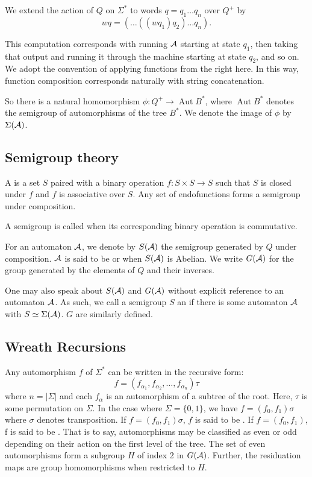 \documentclass[11pt]{article}
\begin{document}
We extend the action of $Q$ on $\Sigma^*$ to words $q = q_1\ldots q_n$
over $Q^+$ by \[ wq = (\ldots((w q_1) q_2)\ldots q_n). \]

This computation corresponds with running $\mathcal{A}$ starting at state $q_1$,
then taking that output and running it through the machine starting at
state $q_2$, and so on. We adopt the convention of applying functions
from the right here. In this way, function composition corresponds
naturally with string concatenation.

So there is a natural homomorphism
$\phi : Q^+ \rightarrow \operatorname{Aut}B^*$, where
$\operatorname{Aut}B^*$ denotes the semigroup of automorphisms of the
tree $B^*$. We denote the image of $\phi$ by $\Sigma(\mathcal{A})$.

\subsection*{Semigroup theory}

A  is a set $S$ paired with a binary operation
$f : S \times S \rightarrow S$ such that $S$ is closed under $f$ and
$f$ is associative over $S$. Any set of endofunctions forms a
semigroup under composition.

A semigroup is called  when its corresponding binary
operation is commutative.

For an automaton $\mathcal{A}$, we denote by $S(\mathcal{A})$ the semigroup generated by
$Q$ under composition. $\mathcal{A}$ is said to be  or
 when $S(\mathcal{A})$ is Abelian. We write $G(\mathcal{A})$ for the group
generated by the elements of $Q$ and their inverses.

One may also speak about $S(\mathcal{A})$ and $G(\mathcal{A})$ without explicit reference
to an automaton $\mathcal{A}$. As such, we call a semigroup $S$ an
 if there is some automaton $\mathcal{A}$ with
$S \simeq \Sigma(\mathcal{A})$.
 $G$ are similarly defined.

\subsection*{Wreath Recursions}
Any automorphism $f$ of $\Sigma^*$ can be written in the recursive form:
\[ f = (f_{\alpha_1}, f_{\alpha_2}, \ldots, f_{\alpha_n})\tau \] where
$n = |\Sigma|$ and each $f_\alpha$ is an automorphism of a subtree of
the root. Here, $\tau$ is some permutation on $\Sigma$. In the case
where $\Sigma = \{0, 1\}$, we have $f = (f_0, f_1)\sigma$ where
$\sigma$ denotes transposition. If $f = (f_0, f_1)\sigma$, $f$ is said
to be . If $f = (f_0, f_1)$, f is said to be
. That is to say, automorphisms may be classified as even
or odd depending on their action on the first level of the tree. The
set of even automorphisms form a subgroup $H$ of index 2 in
$G(\mathcal{A})$. Further, the residuation maps are group homomorphisms when
restricted to $H$.
\end{document}

